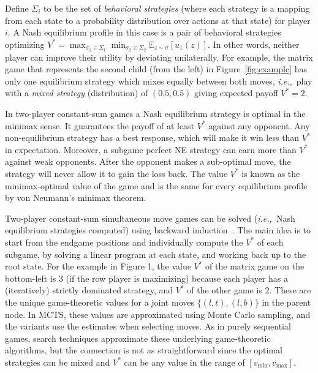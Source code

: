 \documentclass[conference]{IEEEtran}
\newcommand{\bE}{\mathbb{E}}
\newcommand{\cA}{\mathcal{A}}
\newcommand{\cS}{\mathcal{S}}
\newcommand{\ie}{{\it i.e.,}~}
\begin{document}
Define $\Sigma_i$ to be the set of {\it behavioral strategies} (where each strategy is a mapping from each state to 
a probability distribution over actions at that state) for player $i$. A Nash equilibrium profile in this case is a pair of 
behavioral strategies optimizing $V^* = \max_{\sigma_1 \in \Sigma_1} \min_{\sigma_2 \in \Sigma_2} \bE_{z \sim \sigma}[u_1(z)].$
In other words, neither player can improve their utility by deviating unilaterally. 
For example, the matrix game that represents the second child (from the left) in Figure~\ref{fig:example} has only one 
equilibrium strategy which mixes equally between both moves, \ie play with a {\it mixed strategy} (distribution) 
of $(0.5, 0.5)$ giving expected payoff $V^* = 2$. 

In two-player constant-sum games a Nash equilibrium strategy is optimal in the minimax sense. It guarantees the payoff of at least $V^*$ against any opponent. Any 
non-equilibrium strategy has a best response, which will make it win less than $V^*$ in expectation. Moreover, a subgame perfect NE strategy can earn more 
than $V^*$ against weak opponents. After the opponent makes a sub-optimal move, the strategy will never allow it to gain the loss back. 
The value $V^*$ is known as the minimax-optimal value of the game and is the same for every equilibrium profile by von Neumann's minimax theorem.

Two-player constant-sum simultaneous move games can be solved (\ie Nash equilibrium strategies computed) using backward 
induction~\cite{Ross71Goofspiel,Buro03OshiZumo,Rhoads12Computer}. The main idea is to start from the 
endgame positions and individually compute the $V^*$ of each subgame, by solving a linear program at each state, and working back up to the root state.
For the example in Figure 1, the value $V^*$ of the matrix game on the bottom-left is $3$ (if the row player is maximizing) because each player has a (iteratively) strictly dominated strategy, and $V^*$ of the other game is $2$. 
These are the unique game-theoretic values for a joint moves $\{ (l,t), (l,b) \}$ in the parent node.
In MCTS, these values are approximated using Monte Carlo sampling, and the variants use the estimates when selecting moves.
As in purely sequential games, search techniques approximate these underlying game-theoretic algorithms, but  
the connection is not as straightforward since the optimal strategies can be mixed and $V^*$ can be any value 
in the range of $[v_{\min}, v_{\max}]$.
\end{document}
